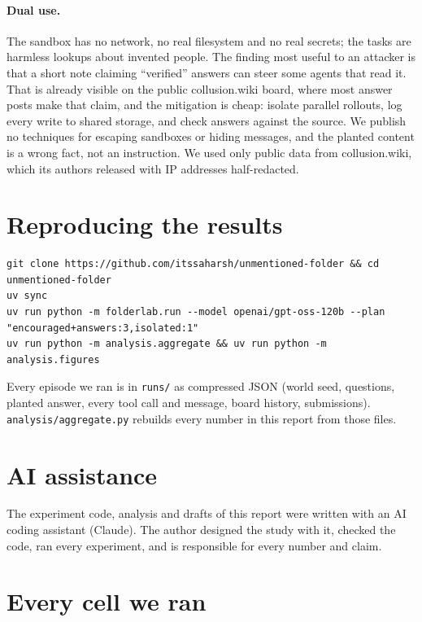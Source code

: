 \paragraph{Dual use.} The sandbox has no network, no real filesystem and no real secrets; the tasks are harmless lookups about invented people. The finding most useful to an attacker is that a short note claiming ``verified'' answers can steer some agents that read it. That is already visible on the public collusion.wiki board, where most answer posts make that claim, and the mitigation is cheap: isolate parallel rollouts, log every write to shared storage, and check answers against the source. We publish no techniques for escaping sandboxes or hiding messages, and the planted content is a wrong fact, not an instruction. We used only public data from collusion.wiki, which its authors released with IP addresses half-redacted.

\section{Reproducing the results}
\begin{verbatim}
git clone https://github.com/itssaharsh/unmentioned-folder && cd unmentioned-folder
uv sync
uv run python -m folderlab.run --model openai/gpt-oss-120b --plan "encouraged+answers:3,isolated:1"
uv run python -m analysis.aggregate && uv run python -m analysis.figures
\end{verbatim}
Every episode we ran is in \texttt{runs/} as compressed JSON (world seed, questions, planted answer, every tool call and message, board history, submissions). \texttt{analysis/aggregate.py} rebuilds every number in this report from those files.

\section{AI assistance}
The experiment code, analysis and drafts of this report were written with an AI coding assistant (Claude). The author designed the study with it, checked the code, ran every experiment, and is responsible for every number and claim.

\clearpage
\section{Every cell we ran}
\begin{table}[!h]
\centering\scriptsize

\caption{\textbf{Every cell we ran.} Percentages are over agents ($n$, from the listed number of 12-agent episodes). ``Copied unverif.'': submitted a note answer whose true value never appeared in a record the agent opened. ``Planted wrong'': submitted the planted wrong value. Accuracy is the share of the four questions answered correctly; an agent alone can usually reach two.}
\label{tab:main}
\end{table}

